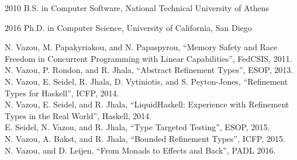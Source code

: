\documentclass[12pt]{ucsddissertation}
\begin{document}
\begin{vita}
\noindent
\begin{cv}{}
\begin{cvlist}{}
\item[2010] B.S. in Computer Software, National Technical University of Athens
\item[2016] Ph.D. in Computer Science, University of California, San Diego
\end{cvlist}
\end{cv}

\publications

\noindent N. Vazou, M. Papakyriakou, and N. Papaspyrou, 
``Memory Safety and Race Freedom in Concurrent Programming with Linear Capabilities'',
FedCSIS, 2011.\\

\noindent N. Vazou, P. Rondon, and R. Jhala,
``Abstract Refinement Types'', 
ESOP, 2013.\\

\noindent N. Vazou, E. Seidel, R. Jhala, D. Vytiniotis, and S. Peyton-Jones,
``Refinement Types for Haskell'', 
ICFP, 2014.\\

\noindent N. Vazou, E. Seidel, and R. Jhala,
``LiquidHaskell: Experience with Refinement Types in the Real World'', 
Haskell, 2014.\\

\noindent E. Seidel, N. Vazou, and R. Jhala,
``Type Targeted Testing'',
ESOP, 2015.\\

\noindent N. Vazou, A. Bakst, and R. Jhala,
``Bounded Refinement Types'',
ICFP, 2015.\\

\noindent N. Vazou, and D. Leijen,
``From Monads to Effects and Back'',
PADL 2016.\\
\end{vita}

\begin{dissertationabstract}

\end{dissertationabstract}

\mainmatter

\begin{dissertationintroduction}

\end{dissertationintroduction}










\backmatter

\end{document}
